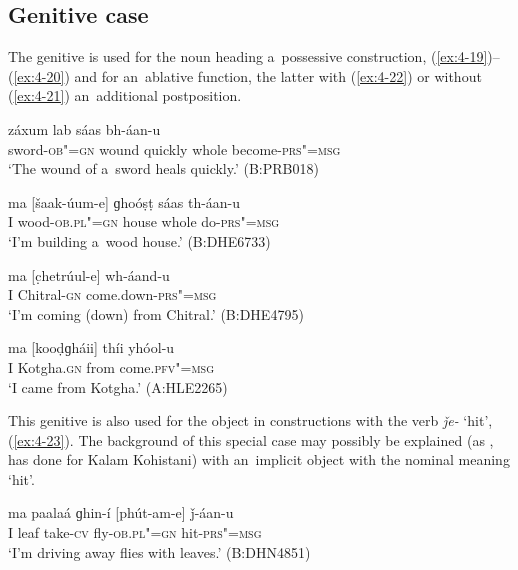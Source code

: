 \subsection{Genitive case}
\label{subsec:4-5-3}

The genitive is used for the noun heading a~possessive construction, (\ref{ex:4-19})--(\ref{ex:4-20}) and for an~ablative function, the latter with (\ref{ex:4-22}) or without (\ref{ex:4-21}) an~additional postposition.


\begin{exe}
\ex
\label{ex:4-19}
\gll [khanɡar-íi-e] záxum lab sáas bh-áan-u \\
	sword-\textsc{ob"=gn} wound quickly whole become-\textsc{prs"=msg} \\
\glt `The wound of a~sword heals quickly.' (B:PRB018)
\end{exe}

\begin{exe}
\ex
\label{ex:4-20}
\gll ma [\v{s}aak-úum-e] ɡhoóṣṭ sáas th-áan-u \\
	I wood-\textsc{ob.pl"=gn} house whole do-\textsc{prs"=msg} \\
\glt `I'm building a~wood house.' (B:DHE6733)
\end{exe}

\begin{exe}
\ex
\label{ex:4-21}
\gll ma [c̣hetrúul-e] wh-áand-u \\
	I Chitral-\textsc{gn} come.down-\textsc{prs"=msg} \\
\glt `I'm coming (down) from Chitral.' (B:DHE4795)
\end{exe}

\begin{exe}
\ex
\label{ex:4-22}
\gll ma [kooḍɡháii] thíi yhóol-u \\
	I Kotgha.\textsc{gn} from come.\textsc{pfv"=msg} \\
\glt `I came from Kotgha.' (A:HLE2265)
\end{exe}

This genitive is also used for the object in constructions with the verb \textit{ǰe-} `hit', (\ref{ex:4-23}). The background of this special case may possibly be explained (as \citealt[43]{baart1999a}, has done for Kalam Kohistani) with an~implicit object with the nominal meaning `hit'.

\begin{exe}
\ex
\label{ex:4-23}
\gll ma paalaá ɡhin-í [phút-am-e] ǰ-áan-u \\
	I leaf take-\textsc{cv} fly-\textsc{ob.pl"=gn} hit-\textsc{prs"=msg} \\
\glt `I'm driving away flies with leaves.' (B:DHN4851)
\end{exe}

